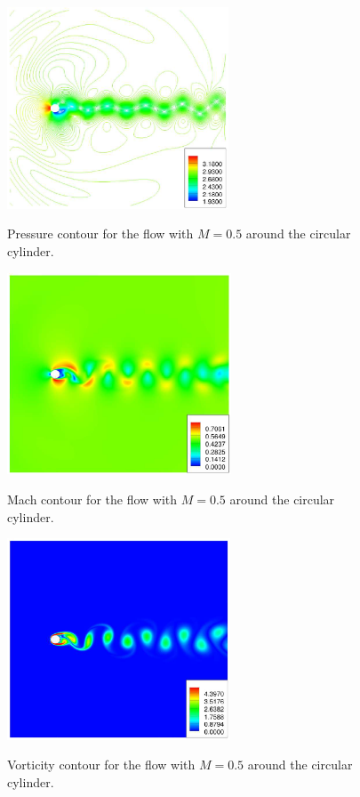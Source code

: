 \begin{figure}
\centering
\includegraphics[height=60mm]{figure_923b} \\
\caption{Pressure contour for the flow with $M = 0.5$ around the circular cylinder.}
\label{fig:figure_923b}
\end{figure}

\begin{figure}
\centering
\includegraphics[height=60mm]{figure_924a} \\
\caption{Mach contour for the flow with $M = 0.5$ around the circular cylinder.}
\label{fig:figure_924a}
\end{figure}

\begin{figure}
\centering
\includegraphics[height=60mm]{figure_924b} \\
\caption{Vorticity contour for the flow with $M = 0.5$ around the circular cylinder.}
\label{fig:figure_924b}
\end{figure}
\newpage
